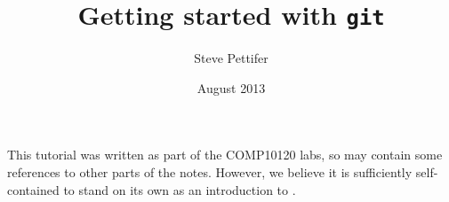 \documentclass[11pt, a4paper]{report}
\title{Getting started with \texttt{git}}
\date{August 2013}
\author{Steve Pettifer}%
\begin{document}
\maketitle
\tableofcontents

This tutorial was written as part of the COMP10120 labs, so may contain some references to other parts of the notes. However, we believe it is sufficiently self-contained to stand on its own as an introduction to .


\printbibliography
\end{document}
